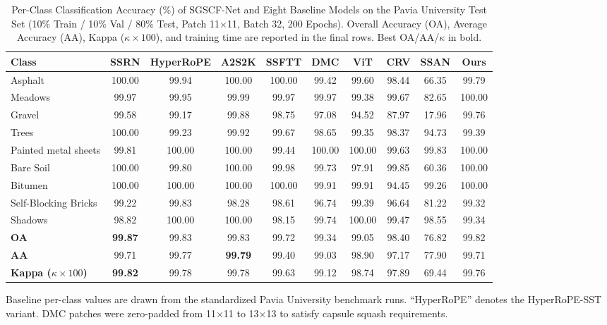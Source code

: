 \documentclass[manuscript,screen,review]{acmart}
\begin{document}
\begin{table}[tbp]
\centering
\scriptsize
\setlength{\tabcolsep}{3.5pt}
\caption{Per-Class Classification Accuracy (\%) of SGSCF-Net and Eight Baseline Models on the Pavia University Test Set (10\% Train / 10\% Val / 80\% Test, Patch 11$\times$11, Batch 32, 200 Epochs). Overall Accuracy (OA), Average Accuracy (AA), Kappa ($\kappa \times 100$), and training time are reported in the final rows. Best OA/AA/$\kappa$ in bold.}
\label{tab:perclass_pu}
\begin{tabular}{p{2.6cm}ccccccccc}
\toprule
\textbf{Class} & \textbf{SSRN} & \textbf{HyperRoPE} & \textbf{A2S2K} & \textbf{SSFTT} & \textbf{DMC} & \textbf{ViT} & \textbf{CRV} & \textbf{SSAN} & \textbf{Ours} \\
\midrule
Asphalt              & 100.00 & 99.94 & 100.00 & 100.00 & 99.42 & 99.60 & 98.44 & 66.35 & 99.79 \\
Meadows              & 99.97 & 99.95 & 99.99 & 99.97 & 99.97 & 99.38 & 99.67 & 82.65 & 100.00 \\
Gravel               & 99.58 & 99.17 & 99.88 & 98.75 & 97.08 & 94.52 & 87.97 & 17.96 & 99.76 \\
Trees                & 100.00 & 99.23 & 99.92 & 99.67 & 98.65 & 99.35 & 98.37 & 94.73 & 99.39 \\
Painted metal sheets & 99.81 & 100.00 & 100.00 & 99.44 & 100.00 & 100.00 & 99.63 & 99.83 & 100.00 \\
Bare Soil            & 100.00 & 99.80 & 100.00 & 99.98 & 99.73 & 97.91 & 99.85 & 60.36 & 100.00 \\
Bitumen              & 100.00 & 100.00 & 100.00 & 100.00 & 99.91 & 99.91 & 94.45 & 99.26 & 100.00 \\
Self-Blocking Bricks & 99.22 & 99.83 & 98.28 & 98.61 & 96.74 & 99.39 & 96.64 & 81.22 & 99.32 \\
Shadows              & 98.82 & 100.00 & 100.00 & 98.15 & 99.74 & 100.00 & 99.47 & 98.55 & 99.34 \\
\midrule
\textbf{OA}          & \textbf{99.87} & 99.83 & 99.83 & 99.72 & 99.34 & 99.05 & 98.40 & 76.82 & 99.82 \\
\textbf{AA}          & 99.71 & 99.77 & \textbf{99.79} & 99.40 & 99.03 & 98.90 & 97.17 & 77.90 & 99.71 \\
\textbf{Kappa ($\kappa\times100$)} & \textbf{99.82} & 99.78 & 99.78 & 99.63 & 99.12 & 98.74 & 97.89 & 69.44 & 99.76 \\
\bottomrule
\end{tabular}
\flushleft
\footnotesize{Baseline per-class values are drawn from the standardized Pavia University benchmark runs. ``HyperRoPE'' denotes the HyperRoPE-SST variant. DMC patches were zero-padded from 11$\times$11 to 13$\times$13 to satisfy capsule squash requirements.}
\end{table}
\end{document}
